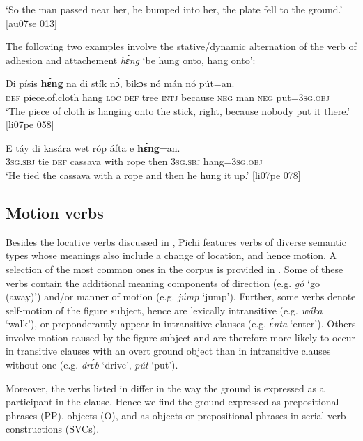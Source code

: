 \glt ‘So the man passed near her, he bumped into her, the plate fell 
to the ground.’ [au07se 013]
\z

The following two examples involve the stative/dynamic alternation of the verb of adhesion and attachement \textit{hɛ́ng} ‘be hung onto, hang onto’:


\ea%
    \label{ex:key:950}
    \gll Di  písis        \textbf{hɛ́ng}  na  di  stík  nɔ́,
bikɔs  nó  mán    nó  pút=an.\\
\textsc{def}  piece.of.cloth    hang  \textsc{loc}  \textsc{def}  tree  \textsc{intj}
because  \textsc{neg}  man    \textsc{neg}  put=\textsc{3sg.obj}\\

\glt ‘The piece of cloth is hanging onto the stick, right, because 
nobody put it there.’ [li07pe 058]
\z


\ea%
    \label{ex:key:951}
    \gll E    táy  di  kasára  wet  róp    áfta    e    \textbf{hɛ́ng}=an.\\
\textsc{3sg.sbj}  tie  \textsc{def}  cassava  with  rope  then  \textsc{3sg.sbj}  hang=\textsc{3sg.obj}\\

\glt ‘He tied the cassava with a rope and then he hung it up.’ [li07pe 078]
\z

\subsection{Motion verbs}\label{sec:8.1.4}

Besides the locative verbs discussed in , Pichi features verbs of diverse semantic types whose meanings also include a change of location, and hence motion. A selection of the most common ones in the corpus is provided in . Some of these verbs contain the additional meaning components of direction (e.g. \textit{gó} ‘go (away)’) and/or manner of motion{\fff} (e.g. \textit{júmp} ‘jump’). Further, some verbs denote self-motion of the figure subject, hence are lexically intransitive (e.g. \textit{wáka} ‘walk’), or preponderantly appear in intransitive clauses (e.g. \textit{ɛ́nta} ‘enter’). Others involve motion caused by the figure subject and are therefore more likely to occur in transitive clauses with an overt ground object than in intransitive clauses without one (e.g. \textit{drɛ́b} ‘drive’, \textit{pút} ‘put’).


Moreover, the verbs listed in  differ in the way the ground is expressed as a participant in the clause. Hence we find the ground expressed as prepositional phrases (PP), objects (O), and as objects or prepositional phrases in serial verb constructions (SVCs).


